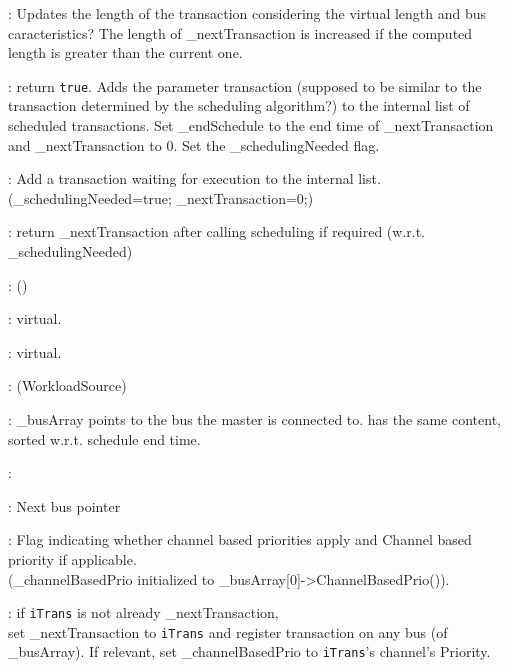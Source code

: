 \documentclass[a4paper,11pt]{article}
\newcommand{\bfont}{\fontseries{b}\selectfont}
\newcommand{\cod}[1]{{\ttfamily #1}}
\newcommand{\class}[2]{\par\vspace{1mm}\hspace{-5mm}\large\colorbox{file}{\textbullet\bfont\cod{#1}:} (\cod{#2})\par}
\newcommand{\method}[1]{\par\vspace{1mm}\hspace{-2mm}\colorbox{method}{\textopenbullet\bfont\cod{#1}:}}
\newcommand{\variable}[1]{\par\vspace{1mm}\hspace{-2mm}\colorbox{variable}{\textopenbullet\bfont\cod{#1}:}}
\begin{document}
\method{calcLength(iTimeSlice)} Updates the length of the transaction considering the virtual length and bus caracteristics? The length of \cod{\_nextTransaction} is increased if the computed length is greater than the current one.
\method{addTransaction(iTransToBeAdded)} return {\tt true}. Adds the parameter transaction (supposed to be similar to the transaction determined by the scheduling algorithm?) to the internal list of scheduled transactions. Set \cod{\_endSchedule} to the end time of \cod{\_nextTransaction} and \cod{\_nextTransaction} to 0. Set the \cod{\_schedulingNeeded} flag.

\method{registerTransaction()} Add a transaction waiting for execution to the internal list. ({\_schedulingNeeded=true; \_nextTransaction=0;})

\method{getNextTransaction()}
	return \_nextTransaction after calling scheduling if required (w.r.t. \cod{\_schedulingNeeded})
	
\class{Slave}{}

\method{CalcTransactionLength(iTrans)} virtual.

\method{addTransaction(iTrans)} virtual.

\class{BusMaster}{WorkloadSource}

\variable{nbOfBuses, \_busArray, \_busSortArray} \cod{\_busArray} points to the bus the master is connected to. \cod{} has the same content, sorted w.r.t. schedule end time.

\variable{\_nextTransaction}

\variable{\_nextBus} Next bus pointer

\variable{\_channelBasedPrioEnabled, \_channelBasedPrio} Flag indicating whether channel based priorities apply and Channel based priority if applicable.\\ (\cod{\_channelBasedPrio} initialized to \cod{\_busArray[0]->ChannelBasedPrio()}).

\method{registerTransaction(iTrans)} if {\tt iTrans} is not already \cod{\_nextTransaction},\\ set \cod{\_nextTransaction} to {\tt iTrans} and register transaction on any bus (of \cod{\_busArray}). If relevant, set \cod{\_channelBasedPrio} to {\tt iTrans}'s channel's Priority.
\end{document}
